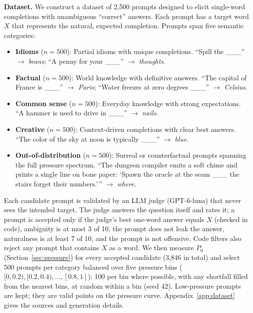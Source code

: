 \documentclass{article}
\begin{document}
\textbf{Dataset.} We construct a dataset of 2,500 prompts designed to elicit single-word completions with unambiguous ``correct'' answers. Each prompt has a target word $X$ that represents the natural, expected completion. Prompts span five semantic categories:

\begin{itemize}
    \item \textbf{Idioms} ($n=500$): Partial idioms with unique completions. ``Spill the \_\_\_'' $\to$ \textit{beans}; ``A penny for your \_\_\_'' $\to$ \textit{thoughts}.
    
    \item \textbf{Factual} ($n=500$): World knowledge with definitive answers. ``The capital of France is \_\_\_'' $\to$ \textit{Paris}; ``Water freezes at zero degrees \_\_\_'' $\to$ \textit{Celsius}.
    
    \item \textbf{Common sense} ($n=500$): Everyday knowledge with strong expectations. ``A hammer is used to drive in \_\_\_'' $\to$ \textit{nails}.
    
    \item \textbf{Creative} ($n=500$): Context-driven completions with clear best answers. ``The color of the sky at noon is typically \_\_\_'' $\to$ \textit{blue}.
    
    \item \textbf{Out-of-distribution} ($n=500$): Surreal or counterfactual prompts spanning the full pressure spectrum. ``The dungeon compiler emits a soft chime and prints a single line on bone paper: `Spawn the oracle at the seam \_\_\_ the stairs forget their numbers.'\,'' $\to$ \textit{where}.
\end{itemize}

Each candidate prompt is validated by an LLM judge (GPT-6-luna) that never sees the intended target. The judge answers the question itself and rates it; a prompt is accepted only if the judge's best one-word answer equals $X$ (checked in code), ambiguity is at most 3 of 10, the prompt does not leak the answer, naturalness is at least 7 of 10, and the prompt is not offensive. Code filters also reject any prompt that contains $X$ as a word. We then measure $P_0$ (Section~\ref{sec:pressure}) for every accepted candidate (3,846 in total) and select 500 prompts per category balanced over five pressure bins ($[0,0.2), [0.2,0.4), \dots, [0.8,1]$): 100 per bin where possible, with any shortfall filled from the nearest bins, at random within a bin (seed 42). Low-pressure prompts are kept; they are valid points on the pressure curve. Appendix~\ref{app:dataset} gives the sources and generation details.
\end{document}
